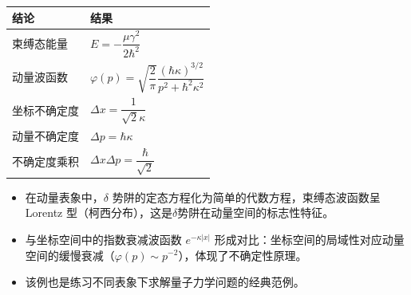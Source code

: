 \begin{formulabox}[答案汇总]
\begin{center}
\begin{tabular}{ll}
\toprule
\textbf{结论} & \textbf{结果} \\
\midrule
束缚态能量 & $E=-\dfrac{\mu\gamma^2}{2\hbar^2}$ \\
动量波函数 & $\varphi(p)=\sqrt{\dfrac{2}{\pi}}\dfrac{(\hbar\kappa)^{3/2}}{p^2+\hbar^2\kappa^2}$ \\
坐标不确定度 & $\Delta x=\dfrac{1}{\sqrt{2}\kappa}$ \\
动量不确定度 & $\Delta p=\hbar\kappa$ \\
不确定度乘积 & $\Delta x\Delta p=\dfrac{\hbar}{\sqrt{2}}$ \\
\bottomrule
\end{tabular}
\end{center}
\end{formulabox}

\begin{insightbox}[物理图像]
\begin{itemize}
    \item 在动量表象中，$\delta$ 势阱的定态方程化为简单的代数方程，束缚态波函数呈 Lorentz 型（柯西分布），这是$\delta$势阱在动量空间的标志性特征。
    \item 与坐标空间中的指数衰减波函数 $e^{-\kappa|x|}$ 形成对比：坐标空间的局域性对应动量空间的缓慢衰减（$\varphi(p)\sim p^{-2}$），体现了不确定性原理。
    \item 该例也是练习不同表象下求解量子力学问题的经典范例。
\end{itemize}
\end{insightbox}
